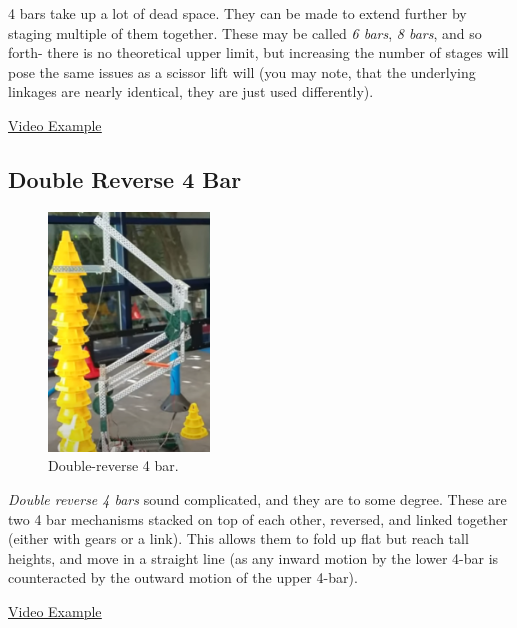4 bars take up a lot of dead space. They can be made to extend further by staging multiple of them together. These may be called \textit{6 bars}, \textit{8 bars}, and so forth- there is no theoretical upper limit, but increasing the number of stages will pose the same issues as a scissor lift will (you may note, that the underlying linkages are nearly identical, they are just used differently).

\href{https://www.youtube.com/watch?v=twwNv4easgk}{\color{red}\underline{Video Example}}

\subsection{Double Reverse 4 Bar}

\begin{figure}[H]
	\includegraphics[height=2.5in]{imgs/double_reverse_4bar.png}
	\caption{Double-reverse 4 bar.}
\end{figure}

\textit{Double reverse 4 bars} sound complicated, and they are to some degree. These are two 4 bar mechanisms stacked on top of each other, reversed, and linked together (either with gears or a link). This allows them to fold up flat but reach tall heights, and move in a straight line (as any inward motion by the lower 4-bar is counteracted by the outward motion of the upper 4-bar).

\href{https://www.youtube.com/watch?v=iFq8dKUZOww}{\color{red}\underline{Video Example}}


